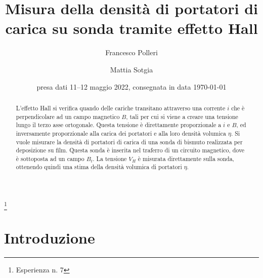 \documentclass[
    prl,
    reprint, 
    superscriptaddress, 
    altaffilletter, 
    amsmath, 
    amssymb, 
    a4paper,
    varvw]{revtex4-2}
\begin{document}
\title{Misura della densità di portatori di carica su sonda tramite effetto Hall
}
\thanks{Esperienza n. 7
}

\author{Francesco Polleri}
\author{Mattia Sotgia}



\date{presa dati
    11--12 maggio 2022, consegnata in data 
    \today
}

\begin{abstract}
    L'effetto Hall si verifica quando delle cariche transitano attraverso una corrente $i$ che è perpendicolare ad un campo magnetico $B$, tali per cui si viene a creare una tensione lungo il terzo asse ortogonale. Questa tensione è direttamente proporzionale a $i$ e $B$, ed inversamente proporzionale alla carica dei portatori e alla loro densità volumica $\eta$.
    Si vuole misurare la densità di portatori di carica di una sonda di bismuto  realizzata per deposizione su film. Questa sonda è inserita nel traferro di un circuito magnetico, dove è sottoposta ad un campo $B_t$. La tensione $V_H$ è misurata direttamente sulla sonda, ottenendo quindi una stima della densità volumica di portatori $\eta$.
\end{abstract}


\maketitle
\thispagestyle{fancy}


\section{Introduzione}
\end{document}
